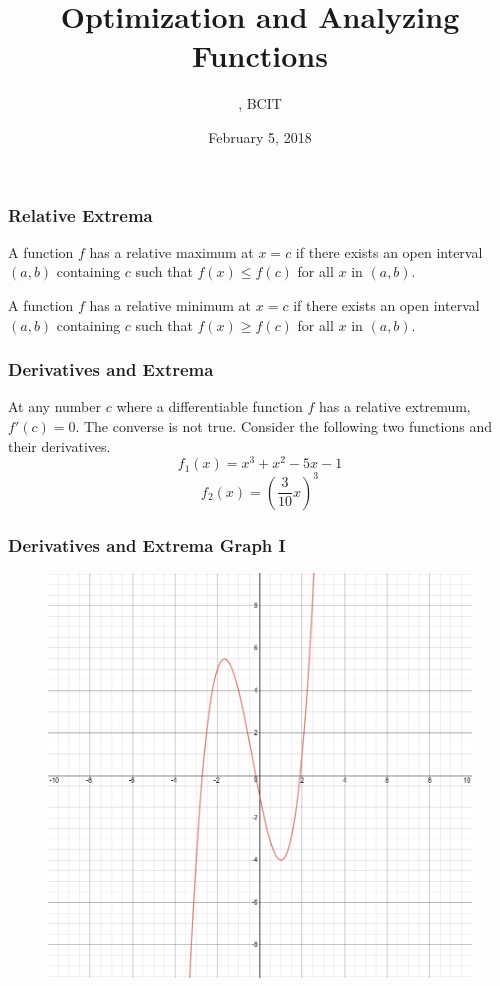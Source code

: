 \documentclass[xcolor=dvipsnames]{beamer}
\title{Optimization and Analyzing Functions}
\subtitle{{\CourseNumber}, BCIT}
\author{\CourseName}
\date{February 5, 2018}
\begin{document}
\begin{frame}
  \titlepage
\end{frame}

\begin{frame}
  \frametitle{Relative Extrema}
A function $f$ has a \alert{relative maximum} at $x=c$ if there exists
an open interval $(a,b)$ containing $c$ such that $f(x)\leq{}f(c)$ for
all $x$ in $(a,b)$.

\bigskip

A function $f$ has a \alert{relative minimum} at $x=c$ if there exists
an open interval $(a,b)$ containing $c$ such that $f(x)\geq{}f(c)$ for
all $x$ in $(a,b)$.
\end{frame}

\begin{frame}
  \frametitle{Derivatives and Extrema}
  At any number $c$ where a differentiable function $f$ has a relative
  extremum, $f'(c)=0$. The converse is not true. Consider the
  following two functions and their derivatives.
\begin{equation}
  \label{eq:thapoich}
f_{1}(x)=x^{3}+x^{2}-5x-1
\end{equation}
\begin{equation}
  \label{eq:gohshaem}
f_{2}(x)=\left(\frac{3}{10}x\right)^{3}
\end{equation}
\end{frame}

\begin{frame}
  \frametitle{Derivatives and Extrema Graph I}
  \begin{figure}[h]
    \includegraphics[scale=.3]{./diagrams/extrema1.png}
  \end{figure}
\end{frame}
\end{document}
